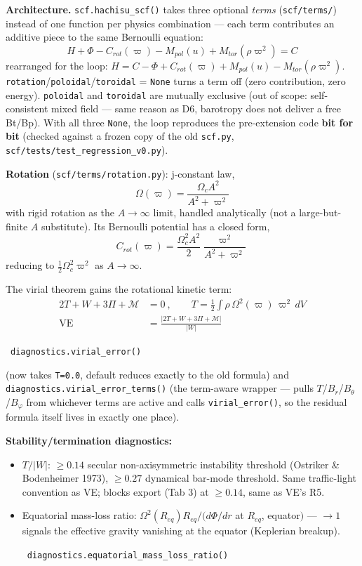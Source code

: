 \documentclass[11pt,a4paper]{scrartcl}
\newcommand{\arrowto}[1]{%
  \par\vspace{2pt}\noindent{\color{linkblue}$\rightarrow$}~\texttt{\small #1}\par\vspace{2pt}}
\newcommand{\code}[1]{\texttt{\small #1}}
\begin{document}
\textbf{Architecture.} \code{scf.hachisu\_scf()} takes three optional
\emph{terms} (\code{scf/terms/}) instead of one function per physics
combination --- each term contributes an additive piece to the same
Bernoulli equation:
\begin{equation}
H + \Phi - C_{rot}(\varpi) - M_{pol}(u) + M_{tor}(\rho\varpi^2) = C
\end{equation}
rearranged for the loop: $H = C - \Phi + C_{rot}(\varpi) + M_{pol}(u) -
M_{tor}(\rho\varpi^2)$. \code{rotation}/\code{poloidal}/\code{toroidal} =
\code{None} turns a term off (zero contribution, zero energy).
\code{poloidal} and \code{toroidal} are mutually exclusive (out of scope:
self-consistent mixed field --- same reason as D6, barotropy does not
deliver a free Bt/Bp). With all three \code{None}, the loop reproduces
the pre-extension code \textbf{bit for bit} (checked against a frozen
copy of the old \code{scf.py}, \code{scf/tests/test\_regression\_v0.py}).

\textbf{Rotation} (\code{scf/terms/rotation.py}): j-constant law,
\begin{equation}
\Omega(\varpi) = \frac{\Omega_c A^2}{A^2+\varpi^2}
\end{equation}
with rigid rotation as the $A\to\infty$ limit, handled analytically (not
a large-but-finite $A$ substitute). Its Bernoulli potential has a closed
form,
\begin{equation}
C_{rot}(\varpi) = \frac{\Omega_c^2 A^2}{2}\frac{\varpi^2}{A^2+\varpi^2}
\end{equation}
reducing to $\tfrac{1}{2}\Omega_c^2\varpi^2$ as $A\to\infty$.

The virial theorem gains the rotational kinetic term:
\begin{align}
2T + W + 3\Pi + \mathcal{M} &= 0 \ ,\qquad T = \tfrac{1}{2}\int \rho\,\Omega^2(\varpi)\,\varpi^2\,dV\\
\mathrm{VE} &= \frac{|2T+W+3\Pi+\mathcal{M}|}{|W|}
\end{align}

\arrowto{diagnostics.virial\_error()} (now takes \code{T=0.0}, default reduces exactly to the old formula) and \code{diagnostics.virial\_error\_terms()} (the term-aware wrapper --- pulls $T$/$B_r$/$B_\theta$/$B_\varphi$ from whichever terms are active and calls \code{virial\_error()}, so the residual formula itself lives in exactly one place).

\textbf{Stability/termination diagnostics:}
\begin{itemize}[leftmargin=1.4em]
\item $T/|W|$: $\ge0.14$ secular non-axisymmetric instability threshold
  (Ostriker \& Bodenheimer 1973), $\ge0.27$ dynamical bar-mode threshold.
  Same traffic-light convention as VE; blocks export (Tab 3) at
  $\ge0.14$, same as VE's R5.
\item Equatorial mass-loss ratio: $\Omega^2(R_{eq})R_{eq} \big/ (d\Phi/dr$
  at $R_{eq}$, equator$)$ --- $\to1$ signals the effective gravity
  vanishing at the equator (Keplerian breakup).
  \arrowto{diagnostics.equatorial\_mass\_loss\_ratio()}
\end{itemize}
\end{document}
